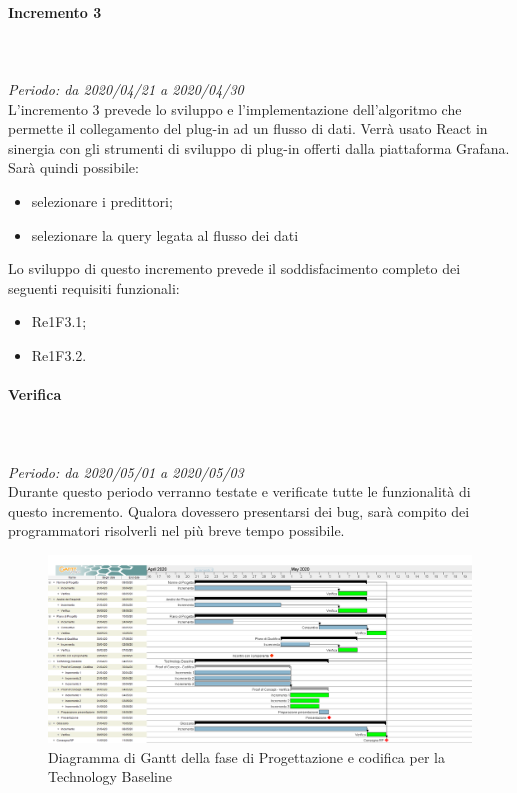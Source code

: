 \paragraph{Incremento 3}\mbox{} \\ \mbox{} \\ 
\textit{Periodo: da 2020/04/21 a 2020/04/30}\\
L’incremento 3 prevede lo sviluppo e l’implementazione dell'algoritmo che permette il collegamento del plug-in ad un flusso di dati. Verrà usato React in sinergia con gli strumenti di sviluppo di plug-in offerti dalla piattaforma Grafana. \\
Sarà quindi possibile:
\begin{itemize}
	\item selezionare i predittori;
	\item selezionare la query legata al flusso dei dati
\end{itemize}
Lo sviluppo di questo incremento prevede il soddisfacimento completo dei seguenti requisiti funzionali:
\begin{itemize}
\item Re1F3.1;
\item Re1F3.2.
\end{itemize}
\paragraph*{Verifica}\mbox{} \\ \mbox{} \\ 
\textit{Periodo: da 2020/05/01 a 2020/05/03}\\
Durante questo periodo verranno testate e verificate tutte le funzionalità di questo incremento. Qualora dovessero presentarsi dei bug, sarà compito dei programmatori risolverli nel più breve tempo possibile.

\begin{figure}[H]
\centering
\includegraphics[scale=0.24]{./img/gantt/progettazione_architetturale.png}
\caption{Diagramma di Gantt della fase di Progettazione e codifica per la Technology Baseline}
\end{figure}

